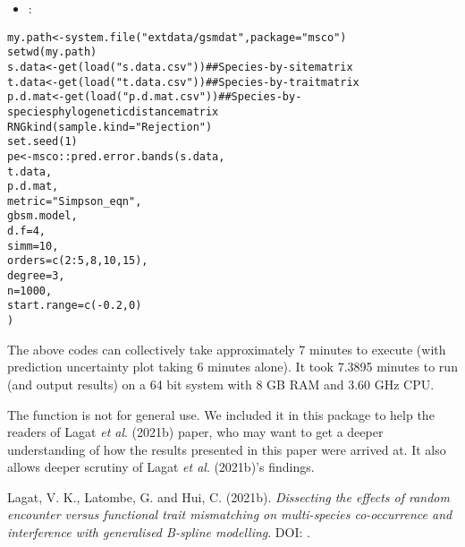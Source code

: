 \documentclass[a4paper]{book}
\begin{document}
\begin{Value}
\begin{itemize}
\begin{itemize}

\item{} :

\end{itemize}
\begin{alltt}  my.path <- system.file("extdata/gsmdat", package = "msco")
  setwd(my.path)
  s.data <- get(load("s.data.csv")) ##Species-by-site matrix
  t.data <- get(load("t.data.csv")) ##Species-by-trait matrix
  p.d.mat <- get(load("p.d.mat.csv")) ##Species-by-species phylogenetic distance matrix
  RNGkind(sample.kind = "Rejection")
  set.seed(1)
  pe <- msco::pred.error.bands(s.data,
                      t.data,
                      p.d.mat,
                      metric = "Simpson_eqn",
                      gbsm.model,
                      d.f = 4,
                      simm = 10,
                      orders = c(2:5, 8, 10, 15),
                      degree = 3,
                      n = 1000,
                      start.range = c(-0.2, 0)
                    )
\end{alltt}


\end{itemize}


 The above codes can collectively take approximately 7 minutes to execute
(with prediction uncertainty plot taking 6 minutes alone). It took 7.3895 minutes
to run (and output results) on a 64 bit system with 8 GB RAM and 3.60 GHz CPU.
\end{Value}
%
\begin{Note}\relax
The function  is not for general use. We included it in this package to help
the readers of Lagat \emph{et al}. (2021b) paper, who may want to get a deeper understanding of how the results
presented in this paper were arrived at. It also allows deeper scrutiny of Lagat \emph{et al}. (2021b)'s
findings.
\end{Note}
%
\begin{References}\relax
Lagat, V. K., Latombe, G. and Hui, C. (2021b). \emph{Dissecting the effects
of random encounter versus functional trait mismatching on multi-species
co-occurrence and interference with generalised B-spline modelling}. DOI: .
\end{References}
%
\begin{Examples}
\end{Examples}
\end{document}
